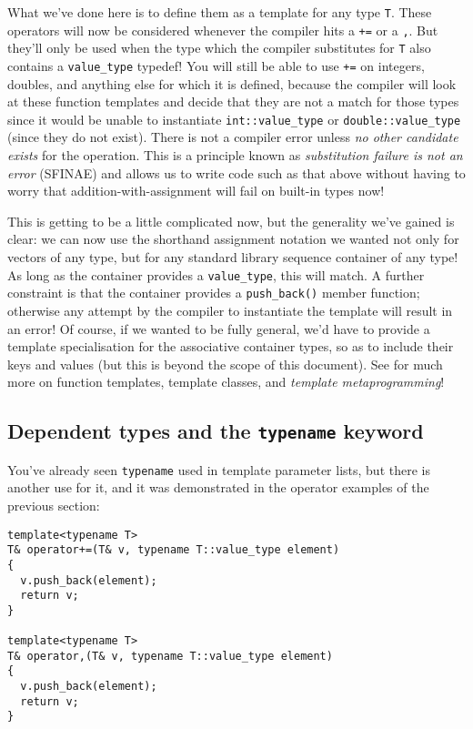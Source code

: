 \documentclass[a4paper]{scrartcl}
\begin{document}
What we've done here is to define them as a template for any type \verb|T|. These operators will now be considered whenever the compiler hits a \verb|+=| or a \verb|,|. But they'll only be used when the type which the compiler substitutes for \verb|T| also contains a \verb|value_type| typedef! You will still be able to use \verb|+=| on integers, doubles, and anything else for which it is defined, because the compiler will look at these function templates and decide that they are not a match for those types since it would be unable to instantiate \verb|int::value_type| or \verb|double::value_type| (since they do not exist). There is not a compiler error unless \emph{no other candidate exists} for the operation. This is a principle known as \emph{substitution failure is not an error} (SFINAE) and allows us to write code such as that above without having to worry that addition-with-assignment will fail on built-in types now!

This is getting to be a little complicated now, but the generality we've gained is clear: we can now use the shorthand assignment notation we wanted not only for vectors of any type, but for any standard library sequence container of any type! As long as the container provides a \verb|value_type|, this will match. A further constraint is that the container provides a \verb|push_back()| member function; otherwise any attempt by the compiler to instantiate the template will result in an error! Of course, if we wanted to be fully general, we'd have to provide a template specialisation for the associative container types, so as to include their keys and values (but this is beyond the scope of this document). See\cite{Templates} for much more on function templates, template classes, and \emph{template metaprogramming}!

\subsection{Dependent types and the \texttt{typename} keyword}
You've already seen \verb|typename| used in template parameter lists, but there is another use for it, and it was demonstrated in the operator examples of the previous section:
\begin{verbatim}
template<typename T>
T& operator+=(T& v, typename T::value_type element)
{
  v.push_back(element);
  return v;
}

template<typename T>
T& operator,(T& v, typename T::value_type element)
{
  v.push_back(element);
  return v;
}
\end{verbatim}
\end{document}
